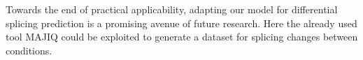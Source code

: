 Towards the end of practical applicability, adapting our model for differential splicing prediction is a promising avenue of future research. Here the already used tool MAJIQ could be exploited to generate a dataset for splicing changes between conditions. 


%
%
% 
%
%
